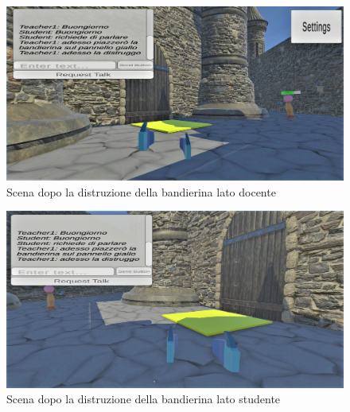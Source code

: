 \begin{figure}[H]
\centering
\includegraphics[scale = 0.25]{Immagini/Dimostrazioni d'uso/bandierinadistruttalatodoc.jpg}
\caption{Scena dopo la distruzione della bandierina lato docente}
\end{figure}
\begin{figure}[H]
\centering
\includegraphics[scale = 0.25]{Immagini/Dimostrazioni d'uso/bandierinadistruttalatostud.jpg}
\caption{Scena dopo la distruzione della bandierina lato studente}
\end{figure}